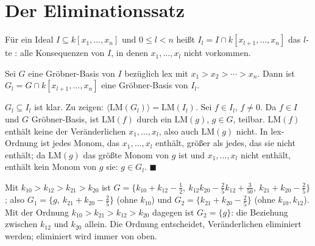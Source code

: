 \section{Der Eliminationssatz}

\begin{definition}
Für ein Ideal $I\subseteq k[x_1, \ldots, x_n]$ und $0\le l < n$ heißt $I_l = I\cap k[x_{l+1}, \ldots, x_n]$ das $l$-te : alle Konsequenzen von $I$, in denen $x_1, \ldots, x_l$ nicht vorkommen.
\end{definition}

\begin{merksatz}
Sei $G$ eine Gröbner-Basis von $I$ bezüglich lex mit $x_1 > x_2 > \cdots > x_n$. Dann ist $G_l = G\cap k[x_{l+1}, \ldots, x_n]$ eine Gröbner-Basis von $I_l$.

$G_l\subseteq I_l$ ist klar. Zu zeigen: $\langle\mathrm{LM}(G_l)\rangle = \mathrm{LM}(I_l)$. Sei $f\in I_l$, $f\ne0$. Da $f\in I$ und $G$ Gröbner-Basis, ist $\mathrm{LM}(f)$ durch ein $\mathrm{LM}(g)$, $g\in G$, teilbar. $\mathrm{LM}(f)$ enthält keine der Veränderlichen $x_1, \ldots, x_l$, also auch $\mathrm{LM}(g)$ nicht. In lex-Ordnung ist jedes Monom, das $x_1, \ldots, x_l$ enthält, größer als jedes, das sie nicht enthält; da $\mathrm{LM}(g)$ das größte Monom von $g$ ist und $x_1, \ldots, x_l$ nicht enthält, enthält kein Monom von $g$ sie: $g\in G_l$. $\blacksquare$

Mit $k_{10} > k_{12} > k_{21} > k_{20}$ ist $G = \{k_{10} + k_{12} - \tfrac12,\ k_{12}k_{20} - \tfrac25k_{12} + \tfrac{3}{50},\ k_{21} + k_{20} - \tfrac25\}$; also $G_1 = \{g,\ k_{21} + k_{20} - \tfrac25\}$ (ohne $k_{10}$) und $G_2 = \{k_{21} + k_{20} - \tfrac25\}$ (ohne $k_{10}, k_{12}$). Mit der Ordnung $k_{10} > k_{21} > k_{12} > k_{20}$ dagegen ist $G_2 = \{g\}$: die Beziehung zwischen $k_{12}$ und $k_{20}$ allein. Die Ordnung entscheidet,  Veränderlichen eliminiert werden; eliminiert wird immer von oben.

\begin{center}
\begin{minipage}{0.88\textwidth}
\end{minipage}
\end{center}
\end{merksatz}

